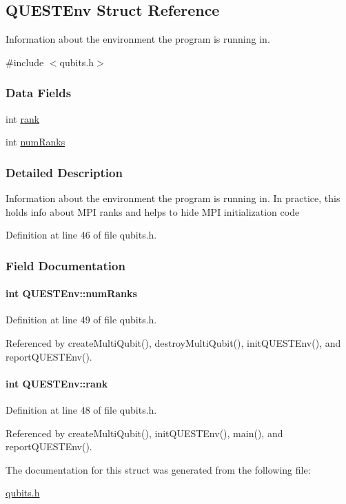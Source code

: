 \hypertarget{structQUESTEnv}{
\subsection{QUESTEnv Struct Reference}
\label{structQUESTEnv}
}


Information about the environment the program is running in.  


{\ttfamily \#include $<$qubits.h$>$}\subsubsection*{Data Fields}
\begin{DoxyCompactItemize}
\item 
int \hyperlink{structQUESTEnv_a1bdb6d425a2ce6a468f93929c0b26d73}{rank}
\item 
int \hyperlink{structQUESTEnv_ab9d9ce82e2d5f1b39aa9efc3accb3742}{numRanks}
\end{DoxyCompactItemize}


\subsubsection{Detailed Description}
Information about the environment the program is running in. In practice, this holds info about MPI ranks and helps to hide MPI initialization code 

Definition at line 46 of file qubits.h.

\subsubsection{Field Documentation}
\hypertarget{structQUESTEnv_ab9d9ce82e2d5f1b39aa9efc3accb3742}{
\paragraph[{numRanks}]{\setlength{\rightskip}{0pt plus 5cm}int {\bf QUESTEnv::numRanks}}\hfill}
\label{structQUESTEnv_ab9d9ce82e2d5f1b39aa9efc3accb3742}


Definition at line 49 of file qubits.h.

Referenced by createMultiQubit(), destroyMultiQubit(), initQUESTEnv(), and reportQUESTEnv().\hypertarget{structQUESTEnv_a1bdb6d425a2ce6a468f93929c0b26d73}{
\paragraph[{rank}]{\setlength{\rightskip}{0pt plus 5cm}int {\bf QUESTEnv::rank}}\hfill}
\label{structQUESTEnv_a1bdb6d425a2ce6a468f93929c0b26d73}


Definition at line 48 of file qubits.h.

Referenced by createMultiQubit(), initQUESTEnv(), main(), and reportQUESTEnv().

The documentation for this struct was generated from the following file:\begin{DoxyCompactItemize}
\item 
\hyperlink{qubits_8h}{qubits.h}\end{DoxyCompactItemize}
